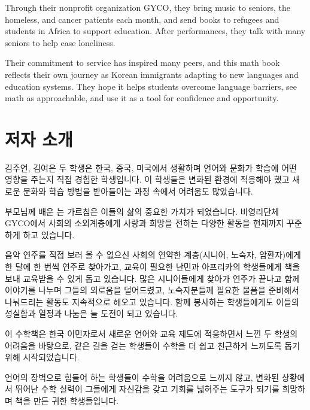 \documentclass[12pt]{book}
\begin{document}
  Through their nonprofit organization GYCO, they bring music to seniors, the 
  homeless, and cancer patients each month, and send books to refugees and students 
  in Africa to support education. After performances, they talk with many seniors 
  to help ease loneliness.
  
  Their commitment to service has inspired many peers, and this math book reflects 
  their own journey as Korean immigrants adapting to new languages and education 
  systems. They hope it helps students overcome language barriers, see math as 
  approachable, and use it as a tool for confidence and opportunity.
  
  \section*{저자 소개}
  김주언, 김여은 두 학생은 한국, 중국, 미국에서 생활하며 언어와 문화가 학습에 어떤 
  영향을 주는지 직접 경험한 학생입니다. 이 학생들은 변화된 환경에 적응해야 했고 새로운 
  문화와 학습 방법을 받아들이는 과정 속에서 어려움도 많았습니다.
  
  부모님께 배운 는 가르침은 이들의 삶의 중요한 
  가치가 되었습니다. 비영리단체 GYCO에서 사회의 소외계층에게 사랑과 희망을 전하는 다양한 
  활동을 현재까지 꾸준하게 하고 있습니다.
  
  음악 연주를 직접 보러 올 수 없으신 사회의 연약한 계층(시니어, 노숙자, 암환자)에게 한 
  달에 한 번씩 연주로 찾아가고, 교육이 필요한 난민과 아프리카의 학생들에게 책을 보내 
  교육받을 수 있게 돕고 있습니다. 많은 시니어들에게 찾아가 연주가 끝나고 함께 이야기를 
  나누며 그들의 외로움을 덜어드렸고, 노숙자분들께 필요한 물품을 준비해서 나눠드리는 활동도 
  지속적으로 해오고 있습니다. 함께 봉사하는 학생들에게도 이들의 성실함과 열정과 나눔은 늘 
  도전이 되고 있습니다.
  
  이 수학책은 한국 이민자로서 새로운 언어와 교육 제도에 적응하면서 느낀 두 학생의 어려움을 
  바탕으로, 같은 길을 걷는 학생들이 수학을 더 쉽고 친근하게 느끼도록 돕기 위해 시작되었습니다.
  
  언어의 장벽으로 힘들어 하는 학생들이 수학을 어려움으로 느끼지 않고, 변화된 상황에서 뛰어난 
  수학 실력이 그들에게 자신감을 갖고 기회를 넓혀주는 도구가 되기를 희망하며 책을 만든 
  귀한 학생들입니다.
\end{document}
